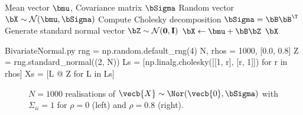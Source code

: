 \begin{algorithm}[H]
	\caption{Normal Random Vector Simulation}
	\label{alg:NormalVectorSim}
	\begin{algorithmic}[1]
		\Require Mean vector $\bmu$, Covariance matrix $\bSigma$
		\Ensure Random vector $\bX \sim \mathcal{N}(\bmu, \bSigma)$
		\State Compute Cholesky decomposition $\bSigma = \bB\bB^\T$
		\State Generate standard normal vector $\bZ \sim \mathcal{N}(\mathbf{0}, \mathbf{I})$
		\State $\bX \gets \bmu + \bB\bZ$
		\State \Return $\bX$
	\end{algorithmic}
\end{algorithm}

\begin{Pcode}{BivariateNormal.py}
	rng = np.random.default_rng(4)
	N, rhos = 1000, [0.0, 0.8]
	Z = rng.standard_normal((2, N))
	Ls = [np.linalg.cholesky([[1, r], [r, 1]]) for r in rhos]
	Xs = [L @ Z for L in Ls]
\end{Pcode}

\begin{figure}[H]
	\centering
	
	\caption{$N=1000$ realisations of $\vecb{X} \sim \Nor(\vecb{0}, \bSigma)$ with $\Sigma_{ii}=1$ for $\rho=0$ (left) and $\rho=0.8$ (right).}
	\label{fig:choleskyComparison}
\end{figure}
